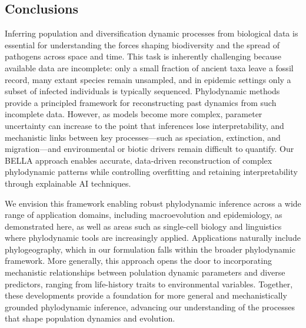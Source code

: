 \subsection{Conclusions}

Inferring population and diversification dynamic processes from biological data is essential for understanding the forces shaping biodiversity and the spread of pathogens across space and time.
This task is inherently challenging because available data are incomplete: only a small fraction of ancient taxa leave a fossil record, many extant species remain unsampled, and in epidemic settings only a subset of infected individuals is typically sequenced.
Phylodynamic methods provide a principled framework for reconstructing past dynamics from such incomplete data.
However, as models become more complex, parameter uncertainty can increase to the point that inferences lose interpretability, and mechanistic links between key processes---such as speciation, extinction, and migration---and environmental or biotic drivers remain difficult to quantify.
Our BELLA approach enables accurate, data-driven reconstruction of complex phylodynamic patterns while controlling overfitting and retaining interpretability through explainable AI techniques.

We envision this framework enabling robust phylodynamic inference across a wide range of application domains, including macroevolution and epidemiology, as demonstrated here, as well as areas such as single-cell biology and linguistics where phylodynamic tools are increasingly applied.
Applications naturally include phylogeography, which in our formulation falls within the broader phylodynamic framework.
More generally, this approach opens the door to incorporating mechanistic relationships between polulation dynamic parameters and diverse predictors, ranging from life-history traits to environmental variables.
Together, these developments provide a foundation for more general and mechanistically grounded phylodynamic inference, advancing our understanding of the processes that shape population dynamics and evolution.